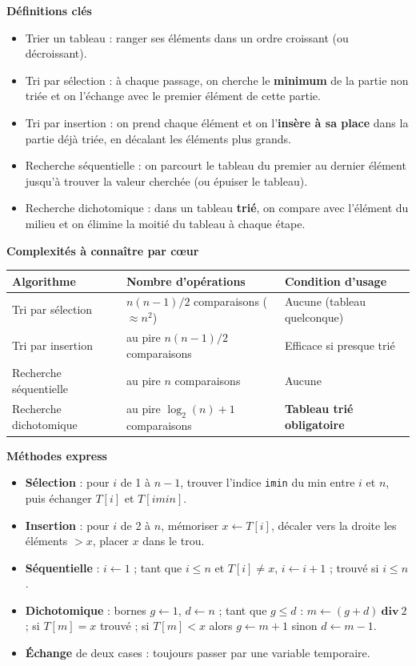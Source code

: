 \documentclass[11pt]{article}
\newcommand{\cle}[1]{{\popxbold\color{popdark}#1}}
\begin{document}
\begin{bilan}
\textbf{Définitions clés}
\begin{itemize}
  \item \cle{Trier} un tableau : ranger ses éléments dans un ordre croissant (ou décroissant).
  \item \cle{Tri par sélection} : à chaque passage, on cherche le \textbf{minimum} de la partie non triée et on l'échange avec le premier élément de cette partie.
  \item \cle{Tri par insertion} : on prend chaque élément et on l'\textbf{insère à sa place} dans la partie déjà triée, en décalant les éléments plus grands.
  \item \cle{Recherche séquentielle} : on parcourt le tableau du premier au dernier élément jusqu'à trouver la valeur cherchée (ou épuiser le tableau).
  \item \cle{Recherche dichotomique} : dans un tableau \textbf{trié}, on compare avec l'élément du milieu et on élimine la moitié du tableau à chaque étape.
\end{itemize}

\textbf{Complexités à connaître par cœur}
\begin{center}
\begin{tabularx}{\linewidth}{|l|X|X|}
\hline
\rowcolor{popblueL} \textbf{Algorithme} & \textbf{Nombre d'opérations} & \textbf{Condition d'usage} \\
\hline
Tri par sélection & $n(n-1)/2$ comparaisons ($\approx n^2$) & Aucune (tableau quelconque) \\
\hline
Tri par insertion & au pire $n(n-1)/2$ comparaisons & Efficace si presque trié \\
\hline
Recherche séquentielle & au pire $n$ comparaisons & Aucune \\
\hline
Recherche dichotomique & au pire $\log_2(n)+1$ comparaisons & \textbf{Tableau trié obligatoire} \\
\hline
\end{tabularx}
\end{center}

\textbf{Méthodes express}
\begin{itemize}
  \item \textbf{Sélection} : pour $i$ de 1 à $n-1$, trouver l'indice \texttt{imin} du min entre $i$ et $n$, puis échanger $T[i]$ et $T[imin]$.
  \item \textbf{Insertion} : pour $i$ de 2 à $n$, mémoriser $x \leftarrow T[i]$, décaler vers la droite les éléments $> x$, placer $x$ dans le trou.
  \item \textbf{Séquentielle} : $i \leftarrow 1$ ; tant que $i \le n$ et $T[i] \ne x$, $i \leftarrow i+1$ ; trouvé si $i \le n$.
  \item \textbf{Dichotomique} : bornes $g \leftarrow 1$, $d \leftarrow n$ ; tant que $g \le d$ : $m \leftarrow (g+d)\ \textbf{div}\ 2$ ; si $T[m]=x$ trouvé ; si $T[m] < x$ alors $g \leftarrow m+1$ sinon $d \leftarrow m-1$.
  \item \textbf{Échange} de deux cases : toujours passer par une variable temporaire.
\end{itemize}
\end{bilan}
\end{document}
